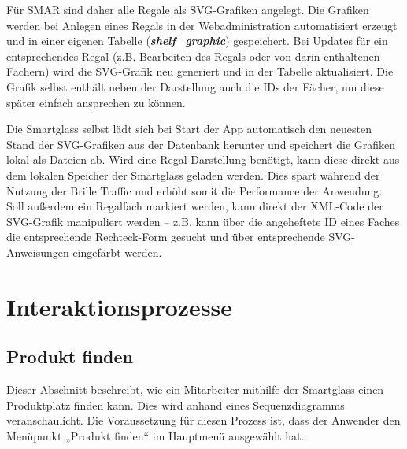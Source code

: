 Für SMAR sind daher alle Regale als \acs{SVG}-Grafiken angelegt. Die Grafiken werden bei Anlegen eines Regals in der Webadministration automatisiert erzeugt und in einer eigenen Tabelle (\textbf{\textit{shelf\_graphic}}) gespeichert. Bei Updates für ein entsprechendes Regal (z.B. Bearbeiten des Regals oder von darin enthaltenen Fächern) wird die \acs{SVG}-Grafik neu generiert und in der Tabelle aktualisiert. Die Grafik selbst enthält neben der Darstellung auch die IDs der Fächer, um diese später einfach ansprechen zu können.

Die Smartglass selbst lädt sich bei Start der App automatisch den neuesten Stand der \acs{SVG}-Grafiken aus der Datenbank herunter und speichert die Grafiken lokal als Dateien ab. Wird eine Regal-Darstellung benötigt, kann diese direkt aus dem lokalen Speicher der Smartglass geladen werden. Dies spart während der Nutzung der Brille Traffic und erhöht somit die Performance der Anwendung. Soll außerdem ein Regalfach markiert werden, kann direkt der \acs{XML}-Code der \acs{SVG}-Grafik manipuliert werden -- z.B. kann über die angeheftete ID eines Faches die entsprechende Rechteck-Form gesucht und über entsprechende \acs{SVG}-Anweisungen eingefärbt werden.


\section{Interaktionsprozesse}

\subsection{Produkt finden}
\label{sec:produkt_finden}
Dieser Abschnitt beschreibt, wie ein Mitarbeiter mithilfe der Smartglass einen Produktplatz finden kann. Dies wird anhand eines Sequenzdiagramms veranschaulicht. Die Voraussetzung für diesen Prozess ist, dass der Anwender den Menüpunkt „Produkt finden“ im Hauptmenü ausgewählt hat.

